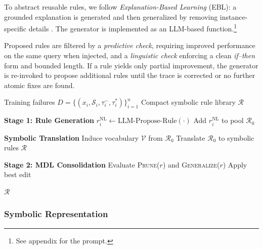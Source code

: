 \documentclass[11pt]{article}
\newcommand{\shortname}{\textsc{RimRule}\xspace}
\begin{document}
To abstract reusable rules, we follow \emph{Explanation-Based Learning} (EBL): a grounded
explanation is generated and then generalized by removing instance-specific details
\citep{mitchell1986explanation,dejong1986explanation}. The generator is implemented as an
LLM-based function.\footnote{See appendix for the prompt.}

Proposed rules are filtered by a \emph{predictive check}, requiring improved performance on
the same query when injected, and a \emph{linguistic check} enforcing a clean \emph{if--then}
form and bounded length. If a rule yields only partial improvement, the generator is
re-invoked to propose additional rules until the trace is corrected or no further atomic
fixes are found.



\begin{algorithm}[h]
\caption{\shortname}
\label{alg:mdlrule}
\small
\begin{algorithmic}[1]
\Require Training failures $D = \{(x_i, \mathcal{S}_i, \tau_i^-, \tau_i^*)\}_{i=1}^n$
\Ensure Compact symbolic rule library $\mathcal{R}$

\Statex \textbf{Stage 1: Rule Generation}
    \State $r_i^{\text{NL}} \gets \text{LLM-Propose-Rule}(\cdot)$
        \State Add $r_i^{\text{NL}}$ to pool $\mathcal{R}_0$
    \EndIf
\EndFor

\Statex \textbf{Symbolic Translation}
\State Induce vocabulary $\mathcal{V}$ from $\mathcal{R}_0$
\State Translate $\mathcal{R}_0$ to symbolic rules $\mathcal{R}$

\Statex \textbf{Stage 2: MDL Consolidation}
\Repeat
        \State Evaluate \textsc{Prune}($r$) and \textsc{Generalize}($r$)
            \State Apply best edit
        \EndIf
    \EndFor
{}

\State \Return $\mathcal{R}$
\end{algorithmic}
\end{algorithm}



\subsubsection{Symbolic Representation} 
\label{sec:canonical} 
\end{document}
